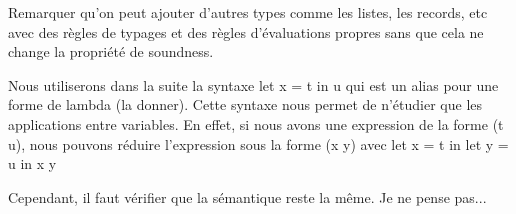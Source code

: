 Remarquer qu'on peut ajouter d'autres types comme les listes, les records,
etc avec des règles de typages et des règles d'évaluations propres sans que
cela ne change la propriété de soundness.

Nous utiliserons dans la suite la syntaxe
let x = t in u qui est un alias pour une forme de lambda (la donner).
Cette syntaxe nous permet de n'étudier que les applications entre variables.
En effet, si nous avons une expression de la forme (t u), nous pouvons réduire
l'expression sous la forme (x y) avec
let x = t in
let y = u in
x y

Cependant, il faut vérifier que la sémantique reste la même. Je ne pense pas...